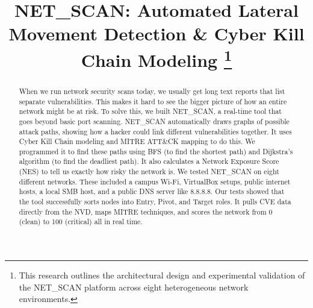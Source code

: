 \documentclass[conference]{IEEEtran}
\begin{document}
\title{NET\_SCAN: Automated Lateral Movement Detection \& Cyber Kill Chain Modeling
\thanks{This research outlines the architectural design and experimental validation of the NET\_SCAN platform across eight heterogeneous network environments.}
}

\author{
\and
{}
\and
{}
}

\maketitle

\begin{abstract}
When we run network security scans today, we usually get long text reports that list separate vulnerabilities. This makes it hard to see the bigger picture of how an entire network might be at risk. To solve this, we built NET\_SCAN, a real-time tool that goes beyond basic port scanning. NET\_SCAN automatically draws graphs of possible attack paths, showing how a hacker could link different vulnerabilities together. It uses Cyber Kill Chain modeling and MITRE ATT\&CK mapping to do this. We programmed it to find these paths using BFS (to find the shortest path) and Dijkstra's algorithm (to find the deadliest path). It also calculates a Network Exposure Score (NES) to tell us exactly how risky the network is. We tested NET\_SCAN on eight different networks. These included a campus Wi-Fi, VirtualBox setups, public internet hosts, a local SMB host, and a public DNS server like 8.8.8.8. Our tests showed that the tool successfully sorts nodes into Entry, Pivot, and Target roles. It pulls CVE data directly from the NVD, maps MITRE techniques, and scores the network from 0 (clean) to 100 (critical) all in real time.
\end{abstract}
\end{document}
